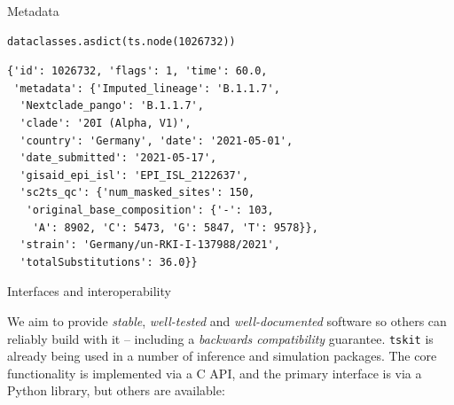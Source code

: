 \documentclass[landscape,a0paper,fontscale=0.4]{baposter}
\newcommand{\tskit}{{\texttt{tskit}}}
\begin{document}
\begin{poster}
\begin{posterbox}[name=inout,column=0,span=1,above=bottom]{Metadata}
\begin{multicols}{2}
    \vspace{2em}

\columnbreak
% 
\tiny
\begin{verbatim}
dataclasses.asdict(ts.node(1026732))
\end{verbatim}
\tiny
\begin{verbatim}
{'id': 1026732, 'flags': 1, 'time': 60.0,
 'metadata': {'Imputed_lineage': 'B.1.1.7',
  'Nextclade_pango': 'B.1.1.7',
  'clade': '20I (Alpha, V1)',
  'country': 'Germany', 'date': '2021-05-01',
  'date_submitted': '2021-05-17',
  'gisaid_epi_isl': 'EPI_ISL_2122637',
  'sc2ts_qc': {'num_masked_sites': 150,
   'original_base_composition': {'-': 103,
    'A': 8902, 'C': 5473, 'G': 5847, 'T': 9578}},
  'strain': 'Germany/un-RKI-I-137988/2021',
  'totalSubstitutions': 36.0}}
\end{verbatim}

\end{multicols}

\end{posterbox}

\begin{posterbox}[name=interop,column=0,row=0,span=1]{Interfaces and interoperability}


We aim to provide \emph{stable}, \emph{well-tested} and \emph{well-documented}
software so others can reliably build with it --
including a \emph{backwards compatibility} guarantee.
\tskit{} is already being used in a number of inference and simulation packages.
The core functionality is implemented via a C API,
and the primary interface is via a Python library,
but others are available:


\end{posterbox}
\end{poster}
\end{document}
